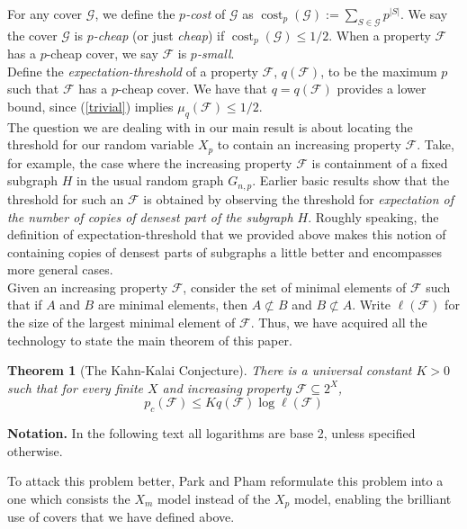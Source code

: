 \documentclass[12pt,oneside,reqno]{amsart}
\newtheorem{theorem}{Theorem}[section]
\theoremstyle{definition}
\numberwithin{equation}{theorem}
\newcommand{\cF}{{\mathcal F}}
\newcommand{\cG}{{\mathcal G}}
\begin{document}
For any cover $\cG$, we define the $p$\emph{-cost} of $\cG$ as $\operatorname{cost}_p(\cG) := \sum_{S \in \mathcal{G}} p^{|S|}$. We say the cover $\cG$ is $p$\emph{-cheap} (or just \emph{cheap}) if $\operatorname{cost}_p(\cG) \leq 1/2$. When a property $\cF$ has a $p$-cheap cover, we say $\cF$ is $p$\emph{-small}.
\\

Define the \emph{expectation-threshold} of a property $\cF$, $q(\cF)$, to be the maximum $p$ such that $\cF$ has a $p$-cheap cover. We have that $q = q(\cF)$ provides a lower bound, since (\ref{trivial}) implies $\mu_{q}(\cF) \leq 1/2$. 
\\

The question we are dealing with in our main result is about locating the threshold for our random variable $X_p$ to contain an increasing property $\cF$. Take, for example, the case where the increasing property $\cF$ is containment of a fixed subgraph $H$ in the usual random graph $G_{n,p}$. Earlier basic results \cite{okkc} show that the threshold for such an $\cF$ is obtained by observing the threshold for \emph{expectation of the number of copies of densest part of the subgraph $H$}. Roughly speaking, the definition of expectation-threshold that we provided above makes this notion of containing copies of densest parts of subgraphs a little better and encompasses more general cases.
\newline 
\\
Given an increasing property $\cF$, consider the set of minimal elements of $\cF$ such that if $A$ and $B$ are minimal elements, then $A \not\subset B$ and $B \not\subset A$. Write $ \ell(\cF)$ for the size of the largest minimal element of $\cF$. Thus, we have acquired all the technology to state the main theorem of this paper.

\begin{theorem}[The Kahn-Kalai Conjecture]\label{kkc}
There is a universal constant $K>0$ such that for every finite $X$ and increasing property $\cF \subseteq 2^{X}$, 
\[
 p_{c}(\mathcal{F}) \leq K q(\mathcal{F}) \log \ell(\mathcal{F})
\]
\end{theorem}

\textbf{Notation.} In the following text all logarithms are base 2, unless specified otherwise.
\newline

To attack this problem better, Park and Pham \cite{ppkkc} reformulate this problem into a one which consists the $X_m$ model instead of the $X_p$ model, enabling the brilliant use of covers that we have defined above. 
\end{document}
